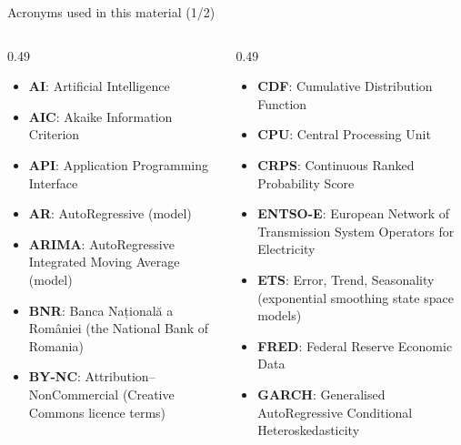 {
\begin{frame}[noframenumbering]
    \titlepage
\end{frame}
}
\begin{frame}{Acronyms used in this material (1/2)}
\begin{columns}[T]
\begin{column}{0.49\textwidth}
\begin{itemize}\setlength{\itemsep}{0pt}
    \item \textbf{AI}: Artificial Intelligence
    \item \textbf{AIC}: Akaike Information Criterion
    \item \textbf{API}: Application Programming Interface
    \item \textbf{AR}: AutoRegressive (model)
    \item \textbf{ARIMA}: AutoRegressive Integrated Moving Average (model)
    \item \textbf{BNR}: Banca Națională a României (the National Bank of Romania)
    \item \textbf{BY-NC}: Attribution–NonCommercial (Creative Commons licence terms)
\end{itemize}
\end{column}
\begin{column}{0.49\textwidth}
\begin{itemize}\setlength{\itemsep}{0pt}
    \item \textbf{CDF}: Cumulative Distribution Function
    \item \textbf{CPU}: Central Processing Unit
    \item \textbf{CRPS}: Continuous Ranked Probability Score
    \item \textbf{ENTSO-E}: European Network of Transmission System Operators for Electricity
    \item \textbf{ETS}: Error, Trend, Seasonality (exponential smoothing state space models)
    \item \textbf{FRED}: Federal Reserve Economic Data
    \item \textbf{GARCH}: Generalised AutoRegressive Conditional Heteroskedasticity
\end{itemize}
\end{column}
\end{columns}
\end{frame}
